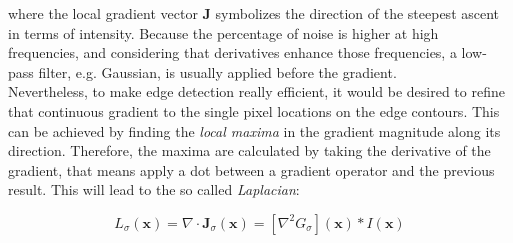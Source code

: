 where the local gradient vector $\mathbf{J}$ symbolizes the direction of the steepest ascent in terms of intensity. 
Because the percentage of noise is higher at high frequencies, and considering that derivatives enhance those frequencies, a low-pass filter, e.g. Gaussian, is usually applied before the gradient.\\
Nevertheless, to make edge detection really efficient, it would be desired to refine that continuous gradient to the single pixel locations on the edge contours. 
This can be achieved by finding the \textit{local maxima} in the gradient magnitude along its direction.
Therefore, the maxima are calculated by taking the derivative of the gradient, that means apply a dot between a gradient operator and the previous result.
This will lead to the so called \textit{Laplacian}:

\begin{equation}
	\label{eqn:laplacian}
	L_{\sigma}(\mathbf{x}) = \nabla \cdot \mathbf{J}_{\sigma}(\mathbf{x}) = [\nabla^2 G_{\sigma}](\mathbf{x}) \ast I(\mathbf{x})
\end{equation}

